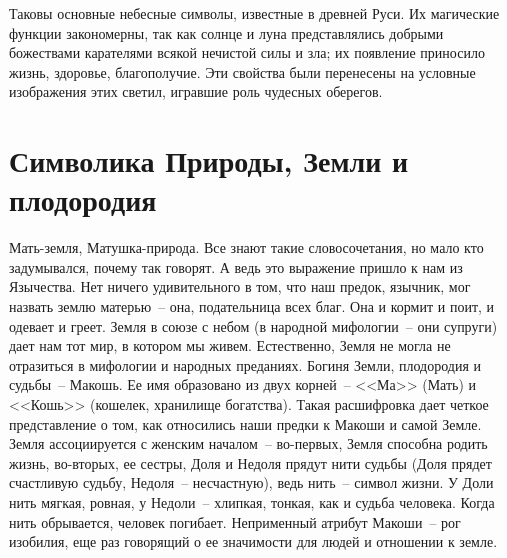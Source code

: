 \documentclass[pscyr,titlepage,chapters]{hedreport}
\begin{document}
  Таковы основные небесные символы, известные в древней Руси. Их магические
  функции закономерны, так как солнце и луна представлялись добрыми божествами
  карателями всякой нечистой силы и зла; их появление приносило жизнь, здоровье,
  благополучие. Эти свойства были перенесены на условные изображения этих
  светил, игравшие роль чудесных оберегов.

  \chapter{Символика Природы, Земли и плодородия}

  Мать-земля, Матушка-природа. Все знают такие словосочетания, но мало кто
  задумывался, почему так говорят. А ведь это выражение пришло к нам из
  Язычества. Нет ничего удивительного в том, что наш предок, язычник, мог
  назвать землю матерью~-- она, подательница всех благ. Она и кормит и поит, и
  одевает и греет. Земля в союзе с небом (в народной мифологии~-- они супруги)
  дает нам тот мир, в котором мы живем. Естественно, Земля не могла не
  отразиться в мифологии и народных преданиях. Богиня Земли, плодородия и
  судьбы~-- Макошь. Ее имя образовано из двух корней~-- <<Ма>> (Мать) и <<Кошь>>
  (кошелек, хранилище богатства). Такая расшифровка дает четкое представление о
  том, как относились наши предки к Макоши и самой Земле. Земля ассоциируется с
  женским началом~-- во-первых, Земля способна родить жизнь, во-вторых, ее
  сестры, Доля и Недоля прядут нити судьбы (Доля прядет счастливую судьбу,
  Недоля~-- несчастную), ведь нить~-- символ жизни. У Доли нить мягкая, ровная,
  у Недоли~-- хлипкая, тонкая, как и судьба человека. Когда нить обрывается,
  человек погибает. Неприменный атрибут Макоши~-- рог изобилия, еще раз
  говорящий о ее значимости для людей и отношении к земле.
\end{document}

